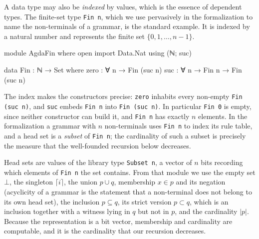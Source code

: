 \documentclass[preprint,12pt]{elsarticle}
\theoremstyle{definition}
\begin{document}
A data type may also be \emph{indexed} by values, which is the essence of
dependent types. The finite-set type \lstinline{Fin n}, which we use pervasively
in the formalization to name the non-terminals of a grammar, is the standard
example. It is indexed by a natural number and represents the finite set
$\{0, 1, \dots, n-1\}$.
\begin{code}[hide]
module AgdaFin where
  open import Data.Nat using (ℕ; suc)
\end{code}
\begin{code}
  data Fin : ℕ → Set where
    zero : ∀ {n} → Fin (suc n)
    suc  : ∀ {n} → Fin n → Fin (suc n)
\end{code}
The index makes the constructors precise: \lstinline{zero} inhabits every
non-empty \lstinline{Fin (suc n)}, and \lstinline{suc} embeds \lstinline{Fin n}
into \lstinline{Fin (suc n)}. In particular \lstinline{Fin 0} is empty, since
neither constructor can build it, and \lstinline{Fin n} has exactly $n$ elements.
In the formalization a grammar with $n$ non-terminals uses \lstinline{Fin n} to
index its rule table, and a head set is a \emph{subset} of \lstinline{Fin n}; the
cardinality of such a subset is precisely the measure that the well-founded
recursion below decreases.

Head sets are values of the library type \lstinline{Subset n}, a vector of $n$ bits
recording which elements of \lstinline{Fin n} the set contains. From that module we use the empty set
$\bot$, the singleton $\lceil i \rceil$, the union $p \cup q$, membership
$x \in p$ and its negation (acyclicity of a grammar is the statement that a
non-terminal does not belong to its own head set), the inclusion
$p \subseteq q$, its strict version $p \subset q$, which is an inclusion
together with a witness lying in $q$ but not in $p$, and the cardinality $|p|$.
Because the representation is a bit vector, membership and cardinality are
computable, and it is the cardinality that our recursion decreases.
\end{document}

